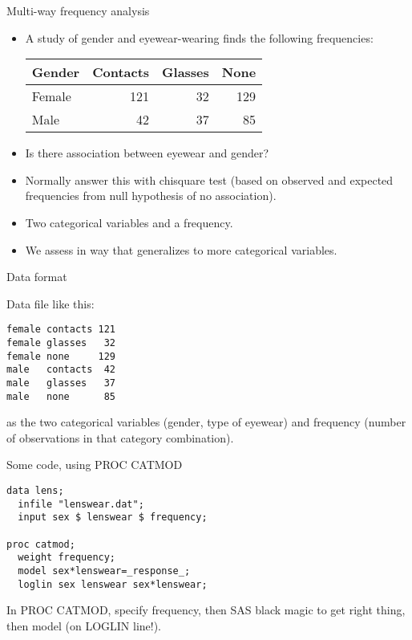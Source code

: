\documentclass[pdf]{prosper}
\begin{document}
\begin{slide}{Multi-way frequency analysis}

  \begin{itemize}
  \item A study of gender and eyewear-wearing finds the following frequencies:

    \begin{tabular}{lrrr}
      \hline
      Gender & Contacts & Glasses & None \\
      \hline
      Female & 121 & 32 & 129 \\
      Male & 42 & 37 & 85\\
      \hline
    \end{tabular}


  \item Is there association between eyewear and gender?
  \item Normally answer this with chisquare test (based on observed and expected frequencies from null hypothesis of no association).
  \item Two categorical variables and a frequency.
  \item We assess in way that generalizes to more categorical variables.

  \end{itemize}

\end{slide}

\begin{slide}{Data format}

Data file like this:

\begin{verbatim}
female contacts 121
female glasses   32
female none     129
male   contacts  42
male   glasses   37
male   none      85
\end{verbatim}

as the two categorical variables (gender, type of eyewear) and frequency (number of observations in that category combination).
  
\end{slide}

\begin{slide}{Some code, using PROC CATMOD}

\begin{verbatim}
data lens;
  infile "lenswear.dat";
  input sex $ lenswear $ frequency;

proc catmod; 
  weight frequency;
  model sex*lenswear=_response_;
  loglin sex lenswear sex*lenswear;
\end{verbatim}

\vspace{3ex}

In PROC CATMOD, specify frequency, then SAS black magic to get right thing, then model (on LOGLIN line!).

  
\end{slide}
\end{document}
